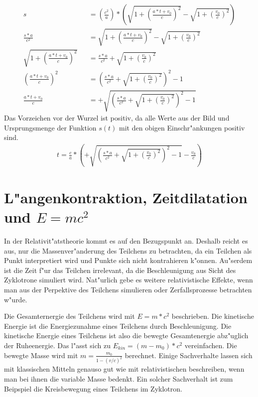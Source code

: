 \documentclass[14pt, a4paper]{report}
\begin{document}
\begin{eqnarray}
s && = \left(\frac{c^2}{a}\right) * \left(\sqrt{1 + \left(\frac{a*t + v_0}{c}\right)^2} - \sqrt{1 + \left(\frac{v_0}{c}\right)^2}\right) \\
\frac{s*a}{c^2}&& = \sqrt{1 + \left(\frac{a*t + v_0}{c}\right)^2} - \sqrt{1 + \left(\frac{v_0}{c}\right)^2}\\
\sqrt{1 + \left(\frac{a*t + v_0}{c}\right)^2} &&= \frac{s*a}{c^2} + \sqrt{1 + \left(\frac{v_0}{c}\right)^2} \\
\left(\frac{a*t + v_0}{c}\right)^2 &&  = \left(\frac{s*a}{c^2} + \sqrt{1 + \left(\frac{v_0}{c}\right)^2}\right)^2 - 1 \\ 
\frac{a*t + v_0}{c} && = +\sqrt{\left(\frac{s*a}{c^2} + \sqrt{1 + \left(\frac{v_0}{c}\right)^2}\right)^2 - 1}
\end{eqnarray}
Das Vorzeichen vor der Wurzel ist positiv, da alle Werte aus der Bild und Ursprungsmenge 
der Funktion $s(t)$ mit den obigen Einschr"ankungen positiv sind.
\begin{eqnarray}
t = \frac{c}{a} * \left( +\sqrt{\left(\frac{s*a}{c^2} + \sqrt{1 + \left(\frac{v_0}{c}\right)^2}\right)^2 - 1} - \frac{v_0}{c}\right)
\end{eqnarray}

\section{L"angenkontraktion, Zeitdilatation und $E=mc^2$}
In der Relativit"atstheorie kommt es auf den Bezugspunkt an. Deshalb reicht es aus, nur
die Massenver"anderung des Teilchens zu betrachten, da ein Teilchen als Punkt 
interpretiert wird und Punkte sich nicht kontrahieren k"onnen. Au"serdem ist die Zeit f"ur das 
Teilchen irrelevant, da die Beschleunigung aus Sicht des Zyklotrone simuliert wird.
Nat"urlich gebe es weitere relativistische Effekte, wenn man aus der Perpektive des 
Teilchens simulieren oder Zerfallsprozesse betrachten w"urde.

Die Gesamternergie des Teilchens wird mit $E = m*c^2$  beschrieben. Die kinetische Energie ist die 
Energiezunahme eines Teilchens durch Beschleunigung. Die kinetische Energie eines
Teilchens ist also die bewegte Gesamtenergie abz"uglich der Ruheenergie. Das l"asst sich zu 
$E_{kin} = (m-m_0)*c^2$ vereinfachen. Die bewegte Masse wird mit 
$m = \frac{m_0}{1-(v/c)^2}$ berechnet.
Einige Sachverhalte lassen sich mit klassischen Mitteln genauso gut wie mit 
relativistischen beschreiben, wenn man bei ihnen die variable Masse bedenkt. Ein solcher
Sachverhalt ist zum Beipspiel die Kreisbewegung eines Teilchens im Zyklotron.
\end{document}

